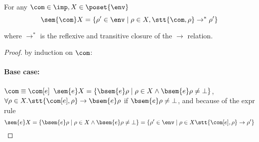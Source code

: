 \begin{lemma}\label{le:link}
  For any \(\com\in\imp, X \in \poset{\env}\)
  \[\sem{\com}X = \{\rho' \in \env \mid \rho \in X, \stt{\com, \rho}
    \to^* \rho'\}\]
\end{lemma}

where \(\to^*\) is the reflexive and transitive closure of the \(\to\)
relation.

\begin{proof}
  by induction on \(\com\):
  \paragraph*{Base case:\\}
  \(\com \equiv \com[e]\) \newline
  \(\sem{e}X = \{\bsem{e}\rho \mid \rho \in X \wedge \bsem{e}\rho \neq
  \bot \}\),
  \(\forall \rho \in X . \stt{\com[e], \rho} \to \bsem{e}\rho\) if
  \(\bsem{e}\rho \neq \bot\), and because of the expr rule
  \[\sem{e}X = \{\bsem{e}\rho \mid \rho \in X \wedge \bsem{e}\rho \neq
    \bot \} = \{\rho' \in\env \mid \rho \in X \stt{\com[e], \rho} \to
    \rho'\}\]

\end{proof}
